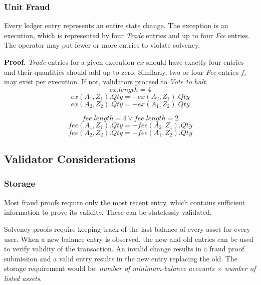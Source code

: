 \documentclass[12pt,a4paper]{article}
\begin{document}
\subsubsection{Unit Fraud}\label{fp:uf}
Every ledger entry represents an entire state change. The exception is an execution, which is represented by four \emph{Trade} entries and up to four \emph{Fee} entries. The operator may put fewer or more entries to violate solvency.

\textbf{Proof.} \emph{Trade} entries for a given execution $ex$ should have exactly four entries and their quantities should add up to zero. Similarly, two or four \emph{Fee} entries $f_i$ may exist per execution. If not, validators proceed to \emph{Vote to halt}.
\begin{equation}
    ex.length = 4
\end{equation}
\begin{equation}
ex(A_1,Z_1).Qty = -ex(A_2,Z_1).Qty
\end{equation}
\begin{equation}
ex(A_2,Z_2).Qty = -ex(A_1,Z_2).Qty 
\end{equation}


\begin{equation}
    fee.length = 4 \lor fee.length = 2
\end{equation}
\begin{equation}
fee(A_1,Z_1).Qty = -fee(A_2,Z_1).Qty 
\end{equation}
\begin{equation}
fee(A_2,Z_2).Qty = -fee(A_1,Z_2).Qty 
\end{equation}
\subsection{Validator Considerations}

\subsubsection{Storage} 
Most fraud proofs require only the most recent entry, which contains sufficient information to prove its validity. These can be statelessly validated. 

Solvency proofs require keeping track of the last balance of every asset for every user. When a new balance entry is observed, the new and old entries can be used to verify validity of the transaction. An invalid change results in a fraud proof submission and a valid entry results in the new entry replacing the old. The storage requirement would be: \emph{number of minimum-balance accounts $\times$ number of listed assets}.
\end{document}
